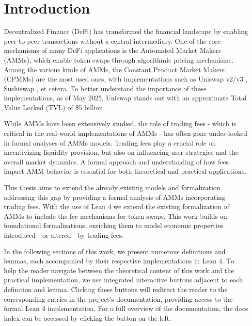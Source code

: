\chapter{Introduction}

Decentralized Finance (DeFi) has transformed the financial landscape by enabling peer-to-peer transactions without a central intermediary. One of the core mechanisms of many DeFi applications is the Automated Market Makers (AMMs), which enable token swaps through algorithmic pricing mechanisms. Among the various kinds of AMMs, the Constant Product Market Makers (CPMMs) are the most used ones, with implementations such as Uniswap v2/v3 \cite{uniswapv2} \cite{uniswapv3}, Sushiswap \cite{sushiswapimpl}, et cetera. To better understand the importance of these implementations, as of May 2025, Uniswap stands out with an approximate Total Value Locked (TVL) of \$5 billion \cite{mottaghi2025tvl}. 

While AMMs have been extensively studied, the role of trading fees - which is critical in the real-world implementations of AMMs - has often gone under-looked in formal analyses of AMMs models. Trading fees play a crucial role on incentivizing liquidity provision, but also on influencing user strategies and the overall market dynamics. A formal approach and understanding of how fees impact AMM behavior is essential for both theoretical and practical applications. 

This thesis aims to extend the already existing models \cite{BCL22lmcs} and formalization \cite{PB24arxiv} addressing this gap by providing a formal analysis of AMMs incorporating trading fees. With the use of Lean 4 \cite{deMoura2021lean4} we extend the existing formalization of AMMs to include the fee mechanisms for token swaps. This work builds on foundational formalizations, enriching them to model economic properties introduced - or altered - by trading fees. 

\citeLean{}

In the following sections of this work, we present numerous definitions and lemmas, each accompanied by their respective implementations in Lean 4. To help the reader navigate between the theoretical content of this work and the practical implementation, we use integrated interactive buttons \cite{citelean2025} adjacent to each definition and lemma. Clicking these buttons will redirect the reader to the corresponding entries in the project's documentation, providing access to the formal Lean 4 implementation. For a full overview of the documentation, the docs index can be accessed by clicking the button on the left.







